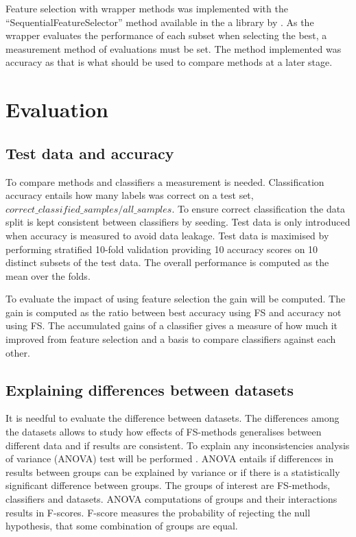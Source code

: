 Feature selection with wrapper methods was implemented with the ``SequentialFeatureSelector'' method available in the a library by \textcite{mlextend}. As the wrapper evaluates the performance of each subset when selecting the best, a measurement method of evaluations must be set. The method implemented was accuracy as that is what should be used to compare methods at a later stage.


\section{Evaluation}
\label{Evaluation}

\subsection{Test data and accuracy}

To compare methods and classifiers a measurement is needed. Classification accuracy entails how many labels was correct on a test set, $correct\_classified\_samples/all\_samples$. To ensure correct classification the data split is kept consistent between classifiers by seeding. Test data is only introduced when accuracy is measured to avoid data leakage. Test data is maximised by performing stratified 10-fold validation providing 10 accuracy scores on 10 distinct subsets of the test data. The overall performance is computed as the mean over the folds.

To evaluate the impact of using feature selection the gain will be computed. The gain is computed as the ratio between best accuracy using FS and accuracy not using FS. The accumulated gains of a classifier gives a measure of how much it improved from feature selection and a basis to compare classifiers against each other.

\subsection{Explaining differences between datasets}

It is needful to evaluate the difference between datasets. The differences among the datasets allows to study how effects of FS-methods generalises between different data and if results are consistent. To explain any inconsistencies analysis of variance (ANOVA) test will be performed \parencite{sthle1989}. ANOVA entails if differences in results between groups can be explained by variance or if there is a statistically significant difference between groups. The groups of interest are FS-methods, classifiers and datasets. ANOVA computations of groups and their interactions results in F-scores. F-score measures the probability of rejecting the null hypothesis, that some combination of groups are equal.
